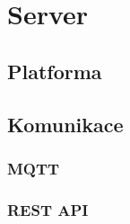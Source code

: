 \documentclass[czech,BP]{thesiskiv}
\begin{document}
	

	
\chapter{Server}

	\section{Platforma}
		
		
	\section{Komunikace}
		\subsection{MQTT}
		
		
		
		
		

		
		
	
		\subsection{REST API}
		
		
\end{document}
